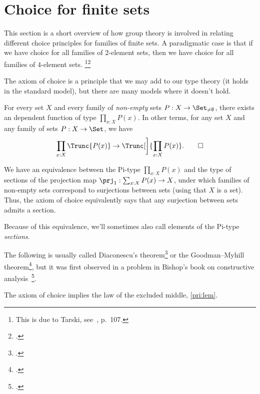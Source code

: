 \section{Choice for finite sets\titledagger}
\label{sec:choicefin}

This section is a short overview of how group theory is involved in
relating different choice principles for families of finite sets.  A
paradigmatic case is that if we have choice for all families of
$2$-element sets, then we have choice for all families of $4$-element
sets.%
\footnote{This is due to Tarski,
  see~\citeauthor{Jech-AC}\footnotemark{}, p.~107.}\footcitetext{Jech-AC}

The axiom of choice is a principle that we may add to our type theory
(it holds in the standard model), but there are many models where it doesn't hold.

\begin{principle}\label{pri:ac}
  For every set $X$ and every family of \emph{non-empty} sets
  $P : X \to \Set_{\ne\emptyset}$,
  there exists an dependent function of type $\prod_{x:X}P(x)$.
  In other terms, for any set $X$ and any family of sets $P:X\to\Set$,
  we have
  \begin{equation}\label{eq:ac-impl}
    \prod_{x:X}\Trunc{P(x)} \to \Trunc[\bigg]{\prod_{x:X}P(x)}.\qedhere
  \end{equation}
\end{principle}

\begin{remark}
  We have an equivalence between the Pi-type $\prod_{x:X}P(x)$ and the
  type of sections of the projection map $\prj_1 : \sum_{x:X}P(x) \to X$,
  under which families of non-empty sets correspond to surjections between sets
  (using that $X$ is a set).
  Thus, the axiom of choice equivalently says that any surjection
  between sets admits a section.

  Because of this equivalence, we'll sometimes also call elements of the
  Pi-type \emph{sections}.
\end{remark}

The following is usually called Diaconescu's theorem\footcite{Diaconescu} or the Goodman--Myhill theorem\footcite{Goodman-Myhill}, but it was first observed in a problem in Bishop's book on constructive analysis~\footcite{Bishop}.

\begin{theorem}
  The axiom of choice implies the law of the excluded middle, \cref{pri:lem}.
\end{theorem}

